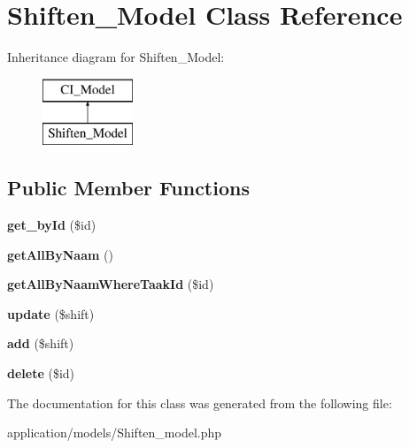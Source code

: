 \hypertarget{class_shiften___model}{}\section{Shiften\+\_\+\+Model Class Reference}
\label{class_shiften___model}
Inheritance diagram for Shiften\+\_\+\+Model\+:\begin{figure}[H]
\begin{center}
\leavevmode
\includegraphics[height=2.000000cm]{class_shiften___model}
\end{center}
\end{figure}
\subsection*{Public Member Functions}
\begin{DoxyCompactItemize}
\item 
\mbox{\label{class_shiften___model_a98d28a4d9a29d40c5a8aa0176f19a919}} 
{\bfseries get\+\_\+by\+Id} (\$id)
\item 
\mbox{\label{class_shiften___model_a2b035b1ffd1cbe651b35bb3e53d72c09}} 
{\bfseries get\+All\+By\+Naam} ()
\item 
\mbox{\label{class_shiften___model_a537c83774b71a66979239cdffbb584d4}} 
{\bfseries get\+All\+By\+Naam\+Where\+Taak\+Id} (\$id)
\item 
\mbox{\label{class_shiften___model_a0275d30c0139203609e59da92dc43790}} 
{\bfseries update} (\$shift)
\item 
\mbox{\label{class_shiften___model_a3fc76f85c3f3f387825bd98a099eb973}} 
{\bfseries add} (\$shift)
\item 
\mbox{\label{class_shiften___model_a2f8258add505482d7f00ea26493a5723}} 
{\bfseries delete} (\$id)
\end{DoxyCompactItemize}


The documentation for this class was generated from the following file\+:\begin{DoxyCompactItemize}
\item 
application/models/Shiften\+\_\+model.\+php\end{DoxyCompactItemize}
